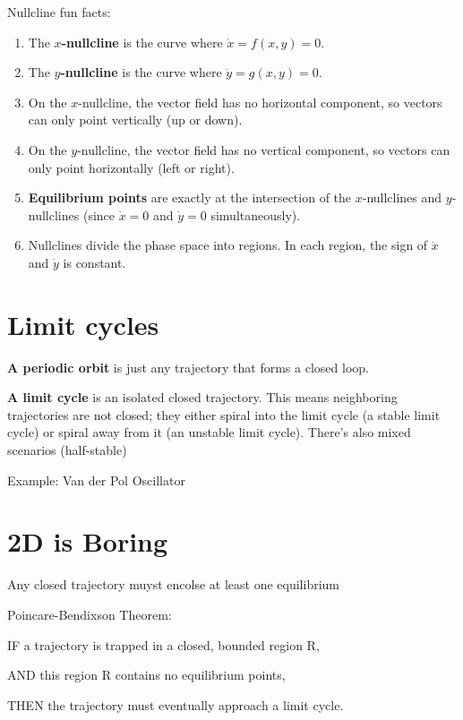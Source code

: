Nullcline fun facts:
\begin{enumerate}
  \item The \textbf{$x$-nullcline} is the curve where $\dot{x} = f(x,y) = 0$.
  \item The \textbf{$y$-nullcline} is the curve where $\dot{y} = g(x,y) = 0$.
  \item On the $x$-nullcline, the vector field has no horizontal component, so vectors can only point vertically (up or down).
  \item On the $y$-nullcline, the vector field has no vertical component, so vectors can only point horizontally (left or right).
  \item \textbf{Equilibrium points} are exactly at the intersection of the $x$-nullclines and $y$-nullclines (since $\dot{x}=0$ and $\dot{y}=0$ simultaneously).
  \item Nullclines divide the phase space into regions. In each region, the sign of $\dot{x}$ and $\dot{y}$ is constant.
\end{enumerate}

\section*{Limit cycles}

\textbf{A periodic orbit} is just any trajectory that forms a closed loop.

\textbf{A limit cycle} is an isolated closed trajectory.
This means neighboring trajectories are not closed; they either spiral into the limit cycle (a stable limit cycle) or spiral away from it (an unstable limit cycle).
There's also mixed scenarios (half-stable)

Example: Van der Pol Oscillator

\section*{2D is Boring}

\begin{theorem}
Any closed trajectory muyst encolse at least one equilibrium
\end{theorem}
\begin{theorem}{Poincare-Bendixson Theorem:}

IF a trajectory is trapped in a closed, bounded region R,

AND this region R contains no equilibrium points,

THEN the trajectory must eventually approach a limit cycle.
\end{theorem}

